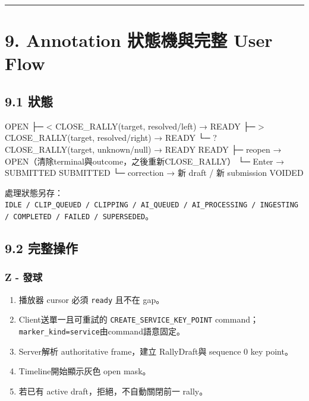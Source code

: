 \documentclass[
  9pt,
  a4paper,
]{article}
\newenvironment{Shaded}{}{}
\newcommand{\NormalTok}[1]{#1}
\providecommand{\tightlist}{%
  \setlength{\itemsep}{0pt}\setlength{\parskip}{0pt}}
\begin{document}
\begin{center}\rule{0.5\linewidth}{0.5pt}\end{center}

\section{9. Annotation 狀態機與完整 User
Flow}\label{9-annotation-ux72c0ux614bux6a5fux8207ux5b8cux6574-user-flow}

\subsection{9.1 狀態}\label{91-ux72c0ux614b}

\begin{Shaded}
\begin{Highlighting}[]
\NormalTok{OPEN}
\NormalTok{  ├─ \textless{} CLOSE\_\allowbreak{}RALLY(target, resolved/left) → READY}
\NormalTok{  ├─ \textgreater{} CLOSE\_\allowbreak{}RALLY(target, resolved/right) → READY}
\NormalTok{  └─ ? CLOSE\_\allowbreak{}RALLY(target, unknown/null) → READY}
\NormalTok{READY}
\NormalTok{  ├─ reopen → OPEN（清除terminal與outcome，之後重新CLOSE\_\allowbreak{}RALLY）}
\NormalTok{  └─ Enter → SUBMITTED}
\NormalTok{SUBMITTED}
\NormalTok{  └─ correction → 新 draft / 新 submission}
\NormalTok{VOIDED}
\end{Highlighting}
\end{Shaded}

處理狀態另存：\texttt{IDLE\ /\ CLIP\_\allowbreak{}QUEUED\ /\ CLIPPING\ /\ AI\_\allowbreak{}QUEUED\ /\ AI\_\allowbreak{}PROCESSING\ /\ INGESTING\ /\ COMPLETED\ /\ FAILED\ /\ SUPERSEDED}。

\subsection{9.2 完整操作}\label{92-ux5b8cux6574ux64cdux4f5c}

\subsubsection{Z - 發球}\label{z---ux767cux7403}

\begin{enumerate}
\def\labelenumi{\arabic{enumi}.}
\tightlist
\item
  播放器 cursor 必須 \texttt{ready} 且不在 gap。
\item
  Client送單一且可重試的 \texttt{CREATE\_\allowbreak{}SERVICE\_\allowbreak{}KEY\_\allowbreak{}POINT}
  command；\texttt{marker\_\allowbreak{}kind=service}由command語意固定。
\item
  Server解析 authoritative frame，建立 RallyDraft與 sequence 0 key
  point。
\item
  Timeline開始顯示灰色 open mask。
\item
  若已有 active draft，拒絕，不自動關閉前一 rally。
\end{enumerate}
\end{document}
